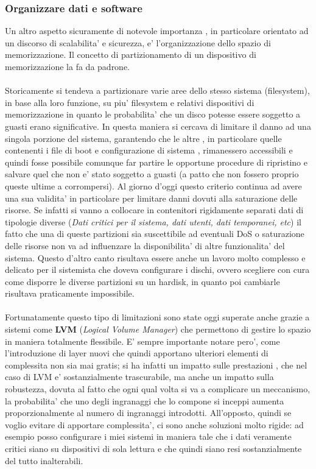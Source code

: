 \subsubsection{Organizzare dati e software}
Un altro aspetto sicuramente di notevole importanza , in particolare orientato ad un discorso di scalabilita' e sicurezza, e' l'organizzazione dello spazio di memorizzazione. Il concetto di partizionamento di un dispositivo di memorizzazione la fa da padrone. 
\\\\
Storicamente si tendeva a partizionare varie aree dello stesso sistema (filesystem), in base alla loro funzione, su piu' filesystem e relativi dispositivi di memorizzazione in quanto le probabilita' che un disco potesse essere soggetto a guasti erano significative. In questa maniera si cercava di limitare il danno ad una singola porzione del sistema, garantendo che le altre , in particolare quelle contenenti i file di boot e configurazione di sistema , rimanessero accessibili e quindi fosse possibile comunque far partire le opportune procedure di ripristino e salvare quel che non e' stato soggetto a guasti (a patto che non fossero proprio queste ultime a corrompersi). Al giorno d'oggi questo criterio continua ad avere una sua validita' in particolare per limitare danni dovuti alla saturazione delle risorse. Se infatti si vanno a collocare in contenitori rigidamente separati dati di tipologie diverse (\emph{Dati critici per il sistema, dati utenti, dati temporanei, etc}) il fatto che una di queste partizioni sia suscettibile ad eventuali DoS o saturazione delle risorse non va ad influenzare la disponibilita' di altre funzionalita' del sistema. Questo d'altro canto risultava essere anche un lavoro molto complesso e delicato per il sistemista che doveva configurare i dischi, ovvero scegliere con cura come disporre le diverse partizioni su un hardisk, in quanto poi cambiarle risultava praticamente impossibile. 
\\\\
Fortunatamente questo tipo di limitazioni sono state oggi superate anche grazie a sistemi come \textbf{LVM} (\emph{Logical Volume Manager}) che permettono di gestire lo spazio in maniera totalmente flessibile. E' sempre importante notare pero', come l'introduzione di layer nuovi che quindi apportano ulteriori elementi di complessita non sia mai gratis; si ha infatti un impatto sulle prestazioni , che nel caso di LVM e' sostanzialmente trascurabile, ma anche un impatto sulla robustezza, dovuta al fatto che ogni qual volta si va a complicare un meccanismo, la probabilita' che uno degli ingranaggi che lo compone si inceppi aumenta proporzionalmente al numero di ingranaggi introdotti. All'opposto, quindi se voglio evitare di apportare complessita', ci sono anche soluzioni molto rigide: ad esempio posso configurare i miei sistemi in maniera tale che i dati veramente critici siano su dispositivi di sola lettura e che quindi siano resi sostanzialmente del tutto inalterabili.

